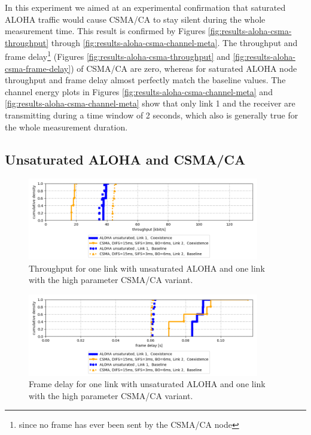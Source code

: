 In this experiment we aimed at an experimental confirmation that saturated ALOHA traffic would cause CSMA/CA to stay silent during the whole measurement time. This result is confirmed by Figures \ref{fig:results-aloha-csma-throughput} through \ref{fig:results-aloha-csma-channel-meta}. The throughput and frame delay\footnote{since no frame has ever been sent by the CSMA/CA node} (Figures \ref{fig:results-aloha-csma-throughput} and \ref{fig:results-aloha-csma-frame-delay}) of CSMA/CA are zero, whereas for saturated ALOHA node throughput and frame delay almost perfectly match the baseline values. The channel energy plots in Figures \ref{fig:results-aloha-csma-channel-meta} and \ref{fig:results-aloha-csma-channel-meta} show that only link 1 and the receiver are transmitting during a time window of 2 seconds, which also is generally true for the whole measurement duration. 

\clearpage

\subsection{Unsaturated ALOHA and CSMA/CA}
\label{sec:unsat-aloha-csma}

\begin{figure}[tb]
	\label{fig:results-unsat-aloha-csma-throughput}
	\begin{center}
		\includegraphics[width=0.9\textwidth]{pictures/results/different_combinations/aloha_unsat_csma/throughput_cdf}
	\end{center}
	\caption{Throughput for one link with unsaturated ALOHA and one link with the high parameter CSMA/CA variant.}
\end{figure}

\begin{figure}[tb]
	\label{fig:results-unsat-aloha-csma-frame-delay}
	\begin{center}
		\includegraphics[width=0.9\textwidth]{pictures/results/different_combinations/aloha_unsat_csma/frame_delay_cdf}
	\end{center}
	\caption{Frame delay for one link with unsaturated ALOHA and one link with the high parameter CSMA/CA variant.}
\end{figure}

